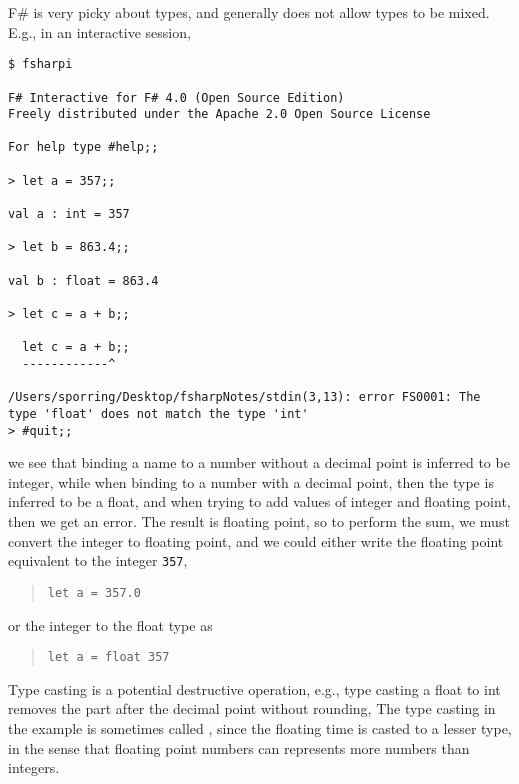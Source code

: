 F\# is very picky about types, and generally does not allow types to be mixed. E.g., in an interactive session,
\begin{lstlisting}[language=console]
$ fsharpi

F# Interactive for F# 4.0 (Open Source Edition)
Freely distributed under the Apache 2.0 Open Source License

For help type #help;;

> let a = 357;;

val a : int = 357

> let b = 863.4;;

val b : float = 863.4

> let c = a + b;;

  let c = a + b;;
  ------------^

/Users/sporring/Desktop/fsharpNotes/stdin(3,13): error FS0001: The type 'float' does not match the type 'int'
> #quit;;
\end{lstlisting}
we see that binding a name to a number without a decimal point is inferred to be integer, while when binding to a number with a decimal point, then the type is inferred to be a float, and when trying to add values of integer and floating point, then we get an error. The result is floating point, so to perform the sum, we must convert the integer to floating point, and we could either write the floating point equivalent to the integer \lstinline|357|,
\begin{quote}
  \lstinline|let a = 357.0|
\end{quote}
or  the integer to the float type as
\begin{quote}
  \lstinline|let a = float 357|
\end{quote}
Type casting is a potential destructive operation, e.g., type casting a float to int removes the part after the decimal point without rounding,
The type casting in the example is sometimes called , since the floating time is casted to a lesser type, in the sense that floating point numbers can represents more numbers than integers.

